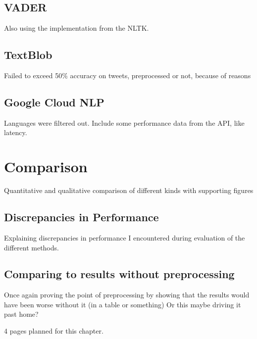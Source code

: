 \subsection{VADER}
\label{subsec:vader}

Also using the implementation from the NLTK.
\cite{Hutto2014}

\subsection{TextBlob}
\label{subsec:textblob}

Failed to exceed 50\% accuracy on tweets, preprocessed or not, because of reasons

\subsection{Google Cloud NLP}
\label{subsec:googleCloudNlp} %

Languages were filtered out.
Include some performance data from the API, like latency.

\section{Comparison}
\label{sec:comparison}

Quantitative and qualitative comparison of different kinds with supporting figures

\subsection{Discrepancies in Performance}
\label{subsec:discrepanciesinperformance}

Explaining discrepancies in performance I encountered during evaluation of the different methods.

\subsection{Comparing to results without preprocessing}
\label{subsec:comparingToResultsWithoutPreprocessing}

Once again proving the point of preprocessing by showing that the results would have been worse without it (in a table or something)
Or this maybe driving it past home?

4 pages planned for this chapter.
\pagebreak[4]
